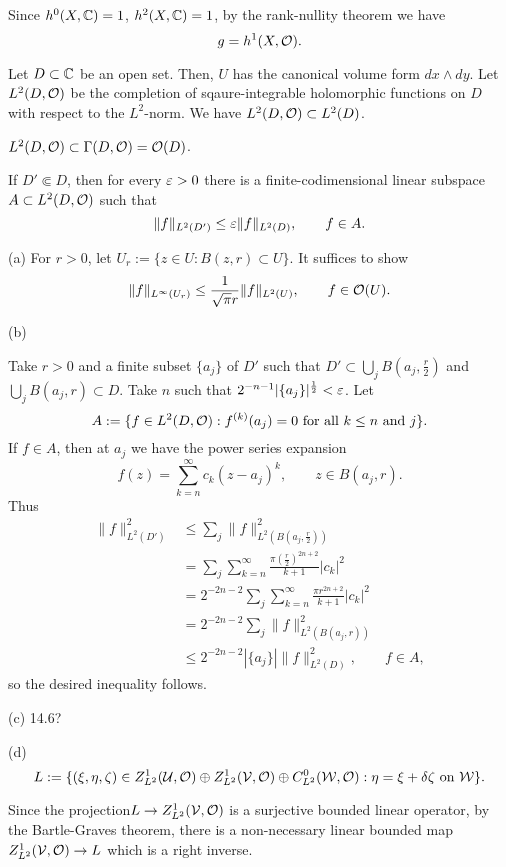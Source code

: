 \documentclass{../../large}
\begin{document}
\begin{prb}
Since $h^0(X,\mathbb{C})=1$, $h^2(X,\mathbb{C})=1$, by the rank-nullity theorem we have
\[g=h^1(X,\mathcal{O}).\]


Let $D\subset\mathbb{C}$ be an open set.
Then, $U$ has the canonical volume form $dx\wedge dy$.
Let $L^2(D,\mathcal{O})$ be the completion of sqaure-integrable holomorphic functions on $D$ with respect to the $L^2$-norm.
We have $L^2(D,\mathcal{O})\subset L^2(D)$.
\begin{parts}
\item $L^2(D,\mathcal{O})\subset\Gamma(D,\mathcal{O})=\mathcal{O}(D)$.
\item If $D'\Subset D$, then for every $\varepsilon>0$ there is a finite-codimensional linear subspace $A\subset L^2(D,\mathcal{O})$ such that
\[\|f\|_{L^2(D')}\le\varepsilon\|f\|_{L^2(D)},\qquad f\in A.\]
\end{parts}
\end{prb}
\begin{pf}
(a)
For $r>0$, let $U_r:=\{z\in U:B(z,r)\subset U\}$.
It suffices to show
\[\|f\|_{L^\infty(U_r)}\le\frac1{\sqrt\pi r}\|f\|_{L^2(U)},\qquad f\in\mathcal{O}(U).\]

(b)

Take $r>0$ and a finite subset $\{a_j\}$ of $D'$ such that $D'\subset\bigcup_jB(a_j,\frac r2)$ and $\bigcup_jB(a_j,r)\subset D$.
Take $n$ such that $2^{-n-1}|\{a_j\}|^{\frac12}<\varepsilon$.
Let
\[A:=\{f\in L^2(D,\mathcal{O}):f^{(k)}(a_j)=0\text{ for all $k\le n$ and $j$}\}.\]
If $f\in A$, then at $a_j$ we have the power series expansion
\[f(z)=\sum_{k=n}^\infty c_k(z-a_j)^k,\qquad z\in B(a_j,r).\]
Thus
\begin{align*}
\|f\|_{L^2(D')}^2&\le\sum_j\|f\|_{L^2(B(a_j,\frac r2))}^2\\
&=\sum_j\sum_{k=n}^\infty\frac{\pi(\frac r2)^{2n+2}}{k+1}|c_k|^2\\
&=2^{-2n-2}\sum_j\sum_{k=n}^\infty\frac{\pi r^{2n+2}}{k+1}|c_k|^2\\
&=2^{-2n-2}\sum_j\|f\|_{L^2(B(a_j,r))}^2\\
&\le2^{-2n-2}|\{a_j\}|\|f\|_{L^2(D)}^2,\qquad f\in A,
\end{align*}
so the desired inequality follows.

(c)
14.6?

(d)
\[L:=\{(\xi,\eta,\zeta)\in Z_{L^2}^1(\mathcal{U},\mathcal{O})\oplus Z_{L^2}^1(\mathcal{V},\mathcal{O})\oplus C_{L^2}^0(\mathcal{W},\mathcal{O}):\eta=\xi+\delta\zeta\text{ on }\mathcal{W}\}.\]

Since the projection$L\to Z_{L^2}^1(\mathcal{V},\mathcal{O})$ is a surjective bounded linear operator, by the Bartle-Graves theorem, there is a non-necessary linear bounded map $Z_{L^2}^1(\mathcal{V},\mathcal{O})\to L$ which is a right inverse.


\end{pf}
\end{document}
